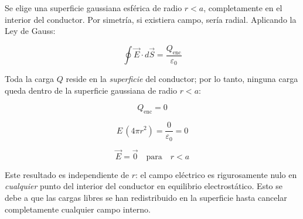 \documentclass[12pt,letterpaper]{article}
\begin{document}
\noindent
\begin{minipage}[c]{0.30\textwidth}
\centering
{}
\end{minipage}%
\hfill
\begin{minipage}[c]{0.67\textwidth}
Se elige una superficie gaussiana esf\'erica de radio $r < a$, completamente
en el interior del conductor. Por simetr\'ia, si existiera campo, ser\'ia radial.
Aplicando la Ley de Gauss:

\[
    \oint \vec{E}\cdot d\vec{S} = \frac{Q_\text{enc}}{\varepsilon_0}
\]

Toda la carga $Q$ reside en la \textit{superficie} del conductor; por lo tanto,
ninguna carga queda dentro de la superficie gaussiana de radio $r < a$:

\[
    Q_\text{enc} = 0
\]

\[
    E\,(4\pi r^2) = \frac{0}{\varepsilon_0} = 0
\]
\end{minipage}

\bigskip

\[
    \boxed{\vec{E} = \vec{0} \quad \text{para} \quad r < a}
\]

\smallskip
\noindent Este resultado es independiente de $r$: el campo el\'ectrico es
rigurosamente nulo en \textit{cualquier} punto del interior del conductor en
equilibrio electrost\'atico. Esto se debe a que las cargas libres se han
redistribuido en la superficie hasta cancelar completamente cualquier campo
interno.

\bigskip

\end{document}
